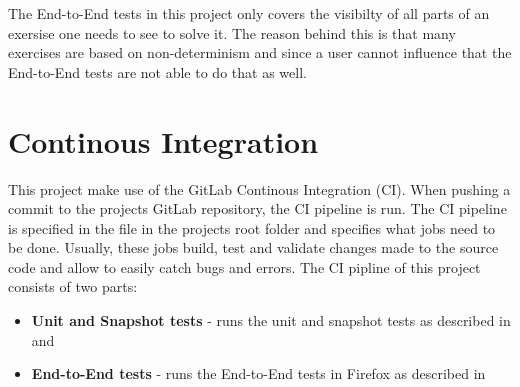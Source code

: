 The End-to-End tests in this project only covers the visibilty of all parts of an exersise one needs to see to solve it. The reason behind this is that many exercises are based on non-determinism and since a user cannot influence that the End-to-End tests are not able to do that as well.

\section{Continous Integration}
\label{section:CI}

This project make use of the GitLab Continous Integration (CI). When pushing a commit to the projects GitLab repository, the CI pipeline is run. The CI pipeline is specified in the  file in the projects root folder and specifies what jobs need to be done. Usually, these jobs build, test and validate changes made to the source code and allow to easily catch bugs and errors.
The CI pipline of this project consists of two parts:

\begin{itemize}
    \item \textbf{Unit and Snapshot tests} - runs the unit and snapshot tests as described in  and 
    \item \textbf{End-to-End tests} - runs the End-to-End tests in Firefox as described in 
\end{itemize}
